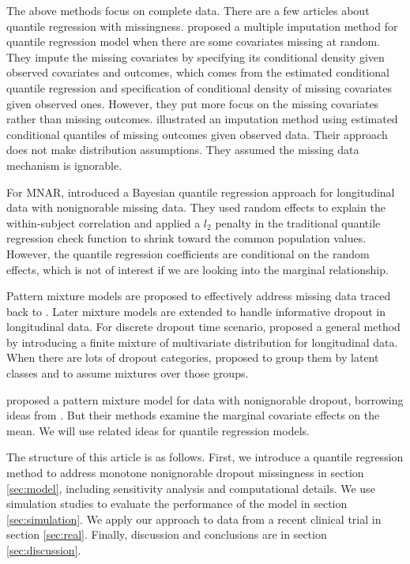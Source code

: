 \documentclass[12pt]{article}
\begin{document}
The above methods focus on complete data.  There are a few
articles about quantile regression with missingness.  \citet{wei2012}
proposed a multiple imputation method for quantile regression model
when there are some covariates missing at random. They impute the
missing covariates by specifying its conditional density given
observed covariates and outcomes, which comes from the estimated
conditional quantile regression and specification of conditional
density of missing covariates given observed ones.  However, they put
more focus on the missing covariates rather than missing outcomes.
\citet{bottai2013} illustrated an  imputation method using estimated
conditional quantiles of missing outcomes given observed data. Their
approach does not make distribution assumptions.
They assumed the missing data mechanism is ignorable.

For MNAR, \citet{yuan2010} introduced a Bayesian quantile regression
approach for longitudinal data with nonignorable missing data. They
used random effects to explain the within-subject correlation and
applied a $l_2$ penalty in the traditional quantile regression check
function to shrink toward the common population values. However, the
quantile regression coefficients are conditional on the random
effects, which is not of interest if we are looking into the marginal
relationship.

Pattern mixture models are proposed to effectively address missing
data traced back to \citet{rubin1977}. Later mixture models are
extended to handle informative dropout in longitudinal data. For
discrete dropout time scenario, \citet{little1993, little1994}
proposed a general method by introducing a finite mixture of
multivariate distribution for longitudinal data. When there are lots
of dropout categories, \citet{roy2003, roy2008} proposed to group them
by latent classes and to assume mixtures over those groups.

\citet{roy2008} proposed a pattern mixture model for data with
nonignorable dropout, borrowing ideas from \citet{heagerty1999}.
But their methods examine the marginal covariate effects on the
mean. We will use related ideas for quantile regression models.

The structure of this article is as follows. First, we introduce a
quantile regression method to address monotone nonignorable dropout
missingness in section \ref{sec:model}, including sensitivity analysis
and computational details.  We use simulation studies to evaluate the
performance of the model in section \ref{sec:simulation}. We apply our
approach to data from a recent clinical trial in section
\ref{sec:real}. Finally, discussion and conclusions are in section
\ref{sec:discussion}.
\end{document}
